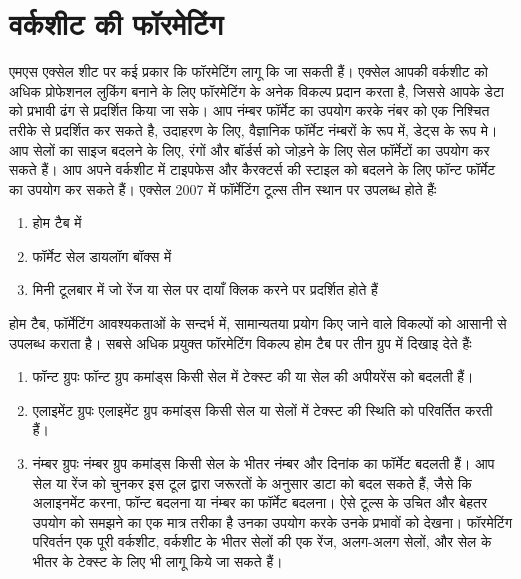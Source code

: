 \chapter{वर्कशीट की फॉरमेटिंग}

एमएस एक्सेल शीट पर कई प्रकार कि फॉरमेटिंग लागू कि जा सकती हैं। एक्सेल आपकी वर्कशीट को अधिक प्रोफेशनल लुकिंग बनाने के लिए फॉरमेटिंग के अनेक विकल्प प्रदान करता है, जिससे आपके डेटा को प्रभावी ढंग से प्रदर्शित किया जा सके। आप नंम्बर फॉर्मेट का उपयोग करके नंबर को एक निश्चित तरीके से प्रदर्शित कर सकते है, उदाहरण के लिए, वैज्ञानिक फॉर्मेट नंम्बरों के रूप में, डेट्स के रूप मे। आप सेलों का साइज बदलने के लिए, रंगों और बॉर्डर्स को जोड़ने के लिए सेल फॉर्मेटों का उपयोग कर सकते हैं। आप अपने वर्कशीट में टाइपफेस और कैरक्टर्स की स्टाइल को बदलने के लिए फॉन्ट फॉर्मेट का उपयोग कर सकते हैं। एक्सेल 2007 में फॉर्मेटिंग टूल्स तीन स्थान पर उपलब्ध होते हैंः
\begin{enumerate}[topsep=-2ex,parsep=0ex,partopsep=0ex,itemsep=0ex]
\item होम टैब में
\item फॉर्मेट सेल डायलॉग बॉक्स में
\item मिनी टूलबार में जो रेंज या सेल पर दायाँ क्लिक करने पर प्रदर्शित होते हैं
\end{enumerate}

\vskip -10pt

होम टैब, फॉर्मेटिंग आवश्यकताओं के सन्दर्भ में, सामान्यतया प्रयोग किए जाने वाले विकल्पों को आसानी से उपलब्ध कराता है। सबसे अधिक प्रयुक्त फॉरमेटिंग विकल्प होम टैब पर तीन ग्रुप में दिखाइ देते हैंः
\begin{enumerate}[topsep=-1ex,parsep=0ex,partopsep=0ex,itemsep=0.5ex]
\renewcommand{\labelenumi}{\theenumi)}
\item फॉन्ट ग्रुपः फॉन्ट ग्रुप कमांड्स किसी सेल में टेक्स्ट की या सेल की अपीयरेंस को बदलती हैं।
\item एलाइमेंट ग्रुपः एलाइमेंट ग्रुप कमांड्स किसी सेल या सेलों में टेक्स्ट की स्थिति को परिवर्तित करती हैं।
\item नंम्बर ग्रुपः नंम्बर ग्रुप कमांड्स किसी सेल के भीतर नंम्बर और दिनांक का फॉर्मेट बदलती हैं। आप सेल या रेंज को चुनकर इस टूल द्वारा जरूरतों के अनुसार डाटा को बदल सकते हैं, जैसे कि अलाइनमेंट करना, फॉन्ट बदलना या नंम्बर का फॉर्मेट बदलना। ऐसे टूल्स के उचित और बेहतर उपयोग को समझने का एक मात्र तरीका है उनका उपयोग करके उनके प्रभावों को देखना। फॉरमेटिंग परिवर्तन एक पूरी वर्कशीट, वर्कशीट के भीतर सेलों की एक रेंज, अलग-अलग सेलों, और सेल के भीतर के टेक्स्ट के लिए भी लागू किये जा सकते हैं।
\end{enumerate}

